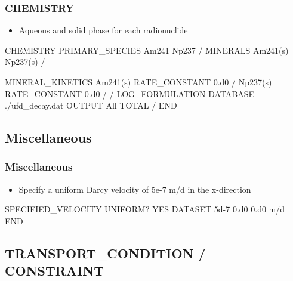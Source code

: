 \documentclass{beamer}
\begin{document}
\begin{frame}\frametitle{CHEMISTRY}

\begin{itemize}
\item Aqueous and solid phase for each radionuclide
\end{itemize}

\begin{semiverbatim}
CHEMISTRY
  PRIMARY_SPECIES
    Am241
    Np237
  /
  MINERALS
    Am241(s)
    Np237(s)
  /
\end{semiverbatim}


\newpage

\begin{semiverbatim}
  MINERAL_KINETICS
    Am241(s)
      RATE_CONSTANT 0.d0
    /
    Np237(s)
      RATE_CONSTANT 0.d0
    /
  /    
  LOG_FORMULATION
  DATABASE ./ufd_decay.dat
  OUTPUT
    All
    TOTAL
  /
END
\end{semiverbatim}

\end{frame}

\subsection{Miscellaneous}

\begin{frame}[fragile]\frametitle{Miscellaneous}

\begin{itemize}
\item Specify a uniform Darcy velocity of 5e-7 m/d in the x-direction
\end{itemize}


\begin{semiverbatim}

SPECIFIED_VELOCITY
  UNIFORM? YES
  DATASET 5d-7 0.d0 0.d0 m/d
END
\end{semiverbatim}

\end{frame}


\subsection{TRANSPORT\_CONDITION / CONSTRAINT}
\end{document}
